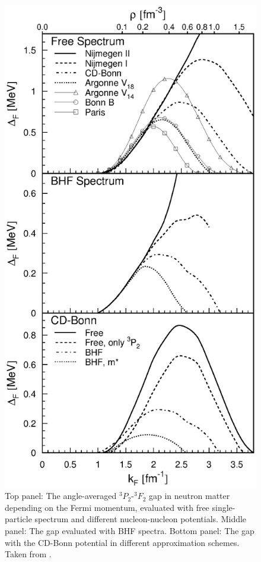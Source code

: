 \documentclass[rmp,aps,floatfix]{revtex4}
\begin{document}
\begin{figure}
\includegraphics[totalheight=17.5cm,angle=0,bb=0 80 350 730]{dean_hjorthjensen_fig07.ps}
\caption{Top panel: The angle-averaged $^3P_2$-$^3F_2$ gap in neutron matter
         depending on the Fermi momentum, evaluated with free 
         single-particle spectrum and different nucleon-nucleon potentials. 
         Middle panel: The gap evaluated with BHF spectra.
         Bottom panel: The gap with the CD-Bonn potential in different 
         approximation schemes. Taken from \cite{pair2}.\label{fig:gaps}}

\end{figure}
\end{document}
